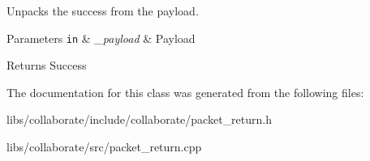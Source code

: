 Unpacks the success from the payload. 


\begin{DoxyParams}[1]{Parameters}
\mbox{\tt in}  & {\em \+\_\+payload} & Payload \\
\hline
\end{DoxyParams}
\begin{DoxyReturn}{Returns}
Success 
\end{DoxyReturn}


The documentation for this class was generated from the following files\+:\begin{DoxyCompactItemize}
\item 
libs/collaborate/include/collaborate/packet\+\_\+return.\+h\item 
libs/collaborate/src/packet\+\_\+return.\+cpp\end{DoxyCompactItemize}
